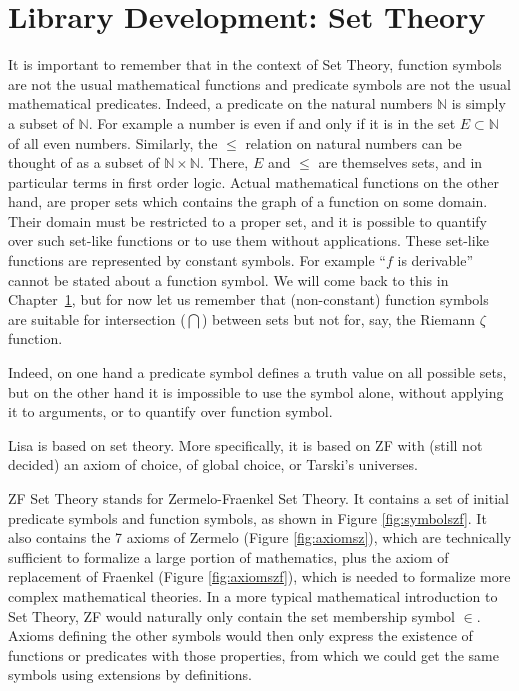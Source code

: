 
\chapter{Library Development: Set Theory}
\label{chapt:settheory}

It is important to remember that in the context of Set Theory, function symbols are not the usual mathematical functions and predicate symbols are not the usual mathematical predicates. Indeed, a predicate on the natural numbers $\mathbb N$ is simply a subset of $\mathbb N$. For example a number is even if and only if it is in the set $E \subset \mathbb N$ of all even numbers. Similarly, the $\leq$ relation on natural numbers can be thought of as a subset of $\mathbb N \times \mathbb N$. There, $E$ and $\leq$ are themselves sets, and in particular terms in first order logic.
Actual mathematical functions on the other hand, are proper sets which contains the graph of a function on some domain. Their domain must be restricted to a proper set, and it is possible to quantify over such set-like functions or to use them without applications. These set-like functions are represented by constant symbols.  For example ``$f$ is derivable'' cannot be stated about a function symbol. We will come back to this in Chapter~\ref{chapt:settheory}, but for now let us remember that (non-constant) function symbols are suitable for intersection ($\bigcap$) between sets but not for, say, the Riemann $\zeta$ function.


Indeed, on one hand a predicate symbol defines a truth value on all possible sets, but on the other hand it is impossible to use the symbol alone, without applying it to arguments, or to quantify over function symbol.

Lisa is based on set theory. More specifically, it is based on ZF with (still not decided) an axiom of choice, of global choice, or Tarski's universes.

ZF Set Theory stands for Zermelo-Fraenkel Set Theory. It contains a set of initial predicate symbols and function symbols, as shown in Figure \ref{fig:symbolszf}. It also contains the 7 axioms of Zermelo (Figure \ref{fig:axiomsz}), which are technically sufficient to formalize a large portion of mathematics, plus the axiom of replacement of Fraenkel (Figure \ref{fig:axiomszf}), which is needed to formalize more complex mathematical theories.
In a more typical mathematical introduction to Set Theory, ZF would naturally only contain the set membership symbol $\in$. Axioms defining the other symbols would then only express the existence of functions or predicates with those properties, from which we could get the same symbols using extensions by definitions.


